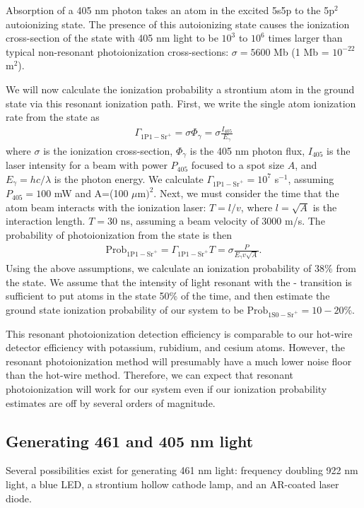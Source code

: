 Absorption of a 405 nm photon takes an atom in the excited 5s5p \sPo to the 5p$^2$ \sDt autoionizing state. The presence of this autoionizing state causes the ionization cross-section of the \sPo state with 405 nm light to be $10^3$ to $10^6$ times larger than typical non-resonant photoionization cross-sections: $\sigma=5600$ Mb (1 Mb = $10^{-22}$ m$^2$). 


We will now calculate the ionization probability a strontium atom in the ground state via this resonant ionization path. First, we write the single atom ionization rate from the \sPo state as 
\begin{eqnarray}
\Gamma_{1\textrm{P}1-\textrm{Sr}^+} = \sigma\Phi_\gamma = \sigma \frac{I_{405}}{E_\gamma} 
\end{eqnarray}
where $\sigma$ is the ionization cross-section, $\Phi_\gamma$ is the 405 nm photon flux, $I_{405}$ is the laser intensity for a beam with power $P_{405}$ focused to a spot size $A$, and $E_\gamma=hc/\lambda$ is the photon energy. We calculate $\Gamma_{1\textrm{P}1-\textrm{Sr}^+} = 10^7$ s$^{-1}$, assuming $P_{405}=100$ mW and A=(100 $\mu\textrm{m})^2$. Next, we must consider the time that the atom beam interacts with the ionization laser: $T=l/v$, where $l=\sqrt{A}$ is the interaction length. $T=30$ ns, assuming a beam velocity of 3000 m/s. The probability of photoionization from the \sPo state is then
\begin{eqnarray}
\textrm{Prob}_{1\textrm{P}1-\textrm{Sr}^+} = \Gamma_{1\textrm{P}1-\textrm{Sr}^+} T = \sigma \frac{P}{E_\gamma v \sqrt{A}}.
\end{eqnarray}
Using the above assumptions, we calculate an ionization probability of 38\% from the \sPo state. We assume that the intensity of light resonant with the \sSz - \sPo transition is sufficient to put atoms in the \sPo state 50\% of the time, and then estimate the ground state ionization probability of our system to be $\textrm{Prob}_{1\textrm{S}0-\textrm{Sr}^+}=10-20\%$. 


This resonant photoionization detection efficiency is comparable to our hot-wire detector efficiency with potassium, rubidium, and cesium atoms. However, the resonant photoionization method will presumably have a much lower noise floor than the hot-wire method. Therefore, we can expect that resonant photoionization will work for our system even if our ionization probability estimates are off by several orders of magnitude.



\subsection{Generating 461 and 405 nm light}
Several possibilities exist for generating 461 nm light: frequency doubling 922 nm light, a blue LED, a strontium hollow cathode lamp, and an AR-coated laser diode.


